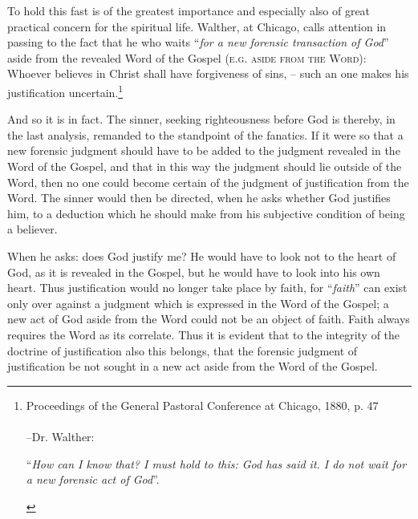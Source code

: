                 To hold this fast is of the greatest importance and especially also of great practical concern for the spiritual life.  Walther, at Chicago, calls attention in passing to the fact that he who waits “\textit{for a new forensic transaction of God}” aside from the revealed Word of the Gospel {\scriptsize\textsc{(e.g. aside from the Word)}}: Whoever believes in Christ shall have forgiveness of sins, -- such an one makes his justification uncertain.\footnote{Proceedings of the General Pastoral Conference at Chicago, 1880, p. 47 \\\\--Dr. Walther: \begin{displayquote}“\textit{How can I know that? I must hold to this: God has said it. I do not wait for a new forensic act of God}”.\end{displayquote}} \par And so it is in fact.  The sinner, seeking righteousness before God is thereby, in the last analysis, remanded to the standpoint of the fanatics.  If it were so that a new forensic judgment should have to be added to the judgment revealed in the Word of the Gospel, and that in this way the judgment should lie outside of the Word, then no one could become certain of the judgment of justification from the Word.  The sinner would then be directed, when he asks whether God justifies him, to a deduction which he should make from his subjective condition of being a believer.  \par When he asks: does God justify me? He would have to look not to the heart of God, as it is revealed in the Gospel, but he would have to look into his own heart.  Thus justification would no longer take place by faith, for “\textit{faith}” can exist only over against a judgment which is expressed in the Word of the Gospel; a new act of God aside from the Word could not be an object of faith.  Faith always requires the Word as its correlate.  Thus it is evident that to the integrity of the doctrine of justification also this belongs, that the forensic judgment of justification be not sought in a new act aside from the Word of the Gospel.